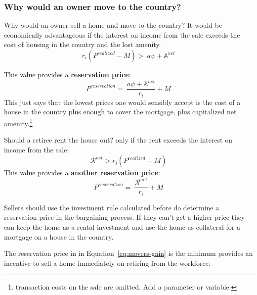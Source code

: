{\subsubsection{Why would an owner move to the country?}
Why would an owner sell a home and move to the country? It would be economically advantageous if the interest on income from the sale exceeds the cost of housing in the country and the lost amenity.
\[r_i(P^{realized}-M) >\ a\psi+ \mathbb{A}^{net}\label{eq:movers-gainA}\]


This value provides a \textbf{reservation price}: 
\[P^{reservation} =\ \frac{a\psi+ \mathbb{A}^{net}}{r_i}+M \label{eq:movers-gainB}\]
This just says that the lowest prices one would sensibly accept is the cost of a house in the country plus enough to cover the mortgage, plus capitalized net amenity.\footnote{transaction costs on the sale are omitted. Add a parameter or variable.}

Should a retiree rent the house out? only if the rent exceeds the  interest on income from the sale:
\[\mathcal{R}^{net}>r_i(P^{realized}-M)\]
This value provides a \textbf{another reservation price}: 
\[P^{reservation} =\ \frac{\mathcal{R}^{net}}{r_i}+M \label{eq:movers-gainC}\]


Sellers should use the investment rule calculated before  do determine a  reservation price in the bargaining process. If they can't get a higher price they  can keep the home as a rental  investment and use the home as collateral for a mortgage on a house in the country.

The reservation price in in Equation~\ref {eq:movers-gain} is the minimum provides an incentive to sell a home immediately on retiring from the workforce. 



}
